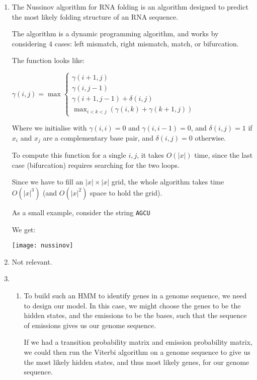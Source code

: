


\begin{enumerate}[label=(\alph*)]

  \item
    The Nussinov algorithm for RNA folding is an algorithm designed to predict the most likely folding structure of an RNA sequence.

    The algorithm is a dynamic programming algorithm, and works by considering 4 cases: left mismatch, right mismatch, match, or bifurcation.

    The function looks like:

    $\gamma(i,j) = \max \begin{cases}\gamma(i+1, j)\\\gamma(i, j-1)\\\gamma(i+1, j-1) + \delta(i,j)\\\max_{i < k < j}(\gamma(i,k) + \gamma(k+1, j))\end{cases}$

    Where we initialise with $\gamma(i, i) = 0$ and $\gamma(i, i-1) = 0$, and $\delta(i,j) = 1$ if $x_i$ and $x_j$ are a complementary base pair, and $\delta(i,j) = 0$ otherwise.

    To compute this function for a single $i,j$, it takes $O(|x|)$ time, since the last case (bifurcation) requires searching for the two loops.

    Since we have to fill an $|x| \times  |x|$ grid, the whole algorithm takes time $O(|x|^3)$ (and $O(|x|^2)$ space to hold the grid).

    As a small example, consider the string \texttt{AGCU}

    We get:

    \texttt{[image: nussinov]}

  \item
    Not relevant.

  \item
    \begin{enumerate}[label=(\roman*)]

      \item
        To build such an HMM to identify genes in a genome sequence, we need to design our model. In this case, we might choose the genes to be the hidden states, and the emissions to be the bases, such that the sequence of emissions gives us our genome sequence.

        If we had a transition probability matrix and emission probability matrix, we could then run the Viterbi algorithm on a genome sequence to give us the most likely hidden states, and thus most likely genes, for our genome sequence.


\end{enumerate}
\end{enumerate}
